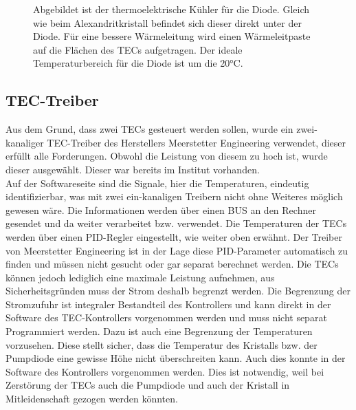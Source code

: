 \begin{figure}
    \centering
    \caption{Abgebildet ist der thermoelektrische Kühler für die Diode. Gleich wie beim Alexandritkristall befindet sich dieser direkt unter der Diode. Für eine bessere Wärmeleitung wird einen Wärmeleitpaste auf die Flächen des TECs aufgetragen. Der ideale Temperaturbereich für die Diode ist um die 20°C.}
    \label{fig:tec_di_hw}
\end{figure}

\subsection{TEC-Treiber}
\label{label_tec_treiber}
Aus dem Grund, dass zwei TECs gesteuert werden sollen, wurde ein zwei-kanaliger TEC-Treiber des Herstellers Meerstetter Engineering verwendet, dieser erfüllt alle Forderungen. Obwohl die Leistung von diesem zu hoch ist, wurde dieser ausgewählt. Dieser war bereits im Institut vorhanden.\\
Auf der Softwareseite sind die Signale, hier die Temperaturen, eindeutig identifizierbar, was mit zwei ein-kanaligen Treibern nicht ohne Weiteres möglich gewesen wäre. Die Informationen werden über einen BUS an den Rechner gesendet und da weiter verarbeitet bzw. verwendet.
Die Temperaturen der TECs werden über einen PID-Regler eingestellt, wie weiter oben erwähnt. Der Treiber von Meerstetter Engineering ist in der Lage diese PID-Parameter automatisch zu finden und müssen nicht gesucht oder gar separat berechnet werden. Die TECs können jedoch lediglich eine maximale Leistung aufnehmen, aus Sicherheitsgründen muss der Strom deshalb begrenzt werden. Die Begrenzung der Stromzufuhr ist integraler Bestandteil des Kontrollers und kann direkt in der Software des TEC-Kontrollers vorgenommen werden und muss nicht separat Programmiert werden. Dazu ist auch eine Begrenzung der Temperaturen vorzusehen. Diese stellt sicher, dass die Temperatur des Kristalls bzw. der Pumpdiode eine gewisse Höhe nicht überschreiten kann. Auch dies konnte in der Software des Kontrollers vorgenommen werden. Dies ist notwendig, weil bei Zerstörung der TECs auch die Pumpdiode und auch der Kristall in Mitleidenschaft gezogen werden könnten.\\

